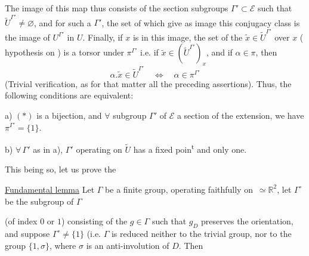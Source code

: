 
The image of this map thus consists of the  section subgroups $\Gamma'\subset\mathcal E$ such that $\widetilde U^{\Gamma'}\ne\varnothing$, and for such a $\Gamma'$, the set of  which  give as image this conjugacy class is the image of $U^{\Gamma'}$ in $U$. Finally, if $x$ is in this image, the set  of the $\widetilde x\in\widetilde U^{\Gamma'}$ over $x$ (\deleted{\unsure{$\ne\varnothing$}} hypothesis on ) is a torsor under $\pi^{\Gamma'}$ i.e. if $\widetilde x\in(\widetilde U^{\Gamma'})_x$,  and if $\alpha\in\pi$, then
\[
\alpha.\widetilde x\in\widetilde U^{\Gamma'}\quad\Longleftrightarrow\quad\alpha\in\pi^{\Gamma'}
\]
(Trivial verification, as for that matter all the preceding assertions). Thus, the following conditions are equivalent:


 a) $(*)$ is a bijection, and $\forall$ subgroup $\Gamma'$ of $\mathcal E$ a section of the extension,  we have $\pi^{\Gamma'}=\{1\}$.

 b) $\forall\,\Gamma'$ as in a), $\Gamma'$ operating on $\widetilde U$ has a fixed poin\textsuperscript{t} and only one.

This being so, let us prove the

\uline{Fundamental lemma} Let $\Gamma$ be a  finite group, operating faithfully on  \,$\simeq\mathbb R^2$, let  $\Gamma^\circ$ be the subgroup of $\Gamma$



(of index $0$ or $1$) consisting of the $g\in\Gamma$ such that $g_D$ preserves the orientation, and suppose $\Gamma^\circ\ne\{1\}$ (i.e. $\Gamma$ is reduced neither to the trivial group, nor to the group  $\{1,\sigma\}$, where $\sigma$ is an anti-involution of $D$. Then

